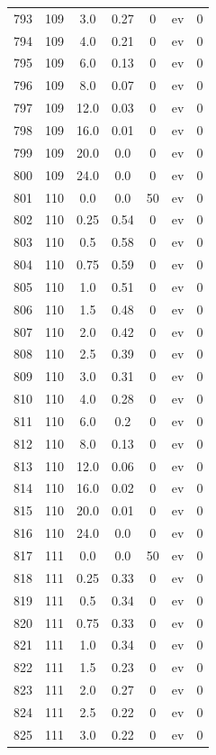\documentclass[12pt,a4paper]{article}
\begin{document}
\begin{tabular}{r|cccccc}
	793 & 109 & 3.0 & 0.27 & 0 & ev & 0 \\
	794 & 109 & 4.0 & 0.21 & 0 & ev & 0 \\
	795 & 109 & 6.0 & 0.13 & 0 & ev & 0 \\
	796 & 109 & 8.0 & 0.07 & 0 & ev & 0 \\
	797 & 109 & 12.0 & 0.03 & 0 & ev & 0 \\
	798 & 109 & 16.0 & 0.01 & 0 & ev & 0 \\
	799 & 109 & 20.0 & 0.0 & 0 & ev & 0 \\
	800 & 109 & 24.0 & 0.0 & 0 & ev & 0 \\
	801 & 110 & 0.0 & 0.0 & 50 & ev & 0 \\
	802 & 110 & 0.25 & 0.54 & 0 & ev & 0 \\
	803 & 110 & 0.5 & 0.58 & 0 & ev & 0 \\
	804 & 110 & 0.75 & 0.59 & 0 & ev & 0 \\
	805 & 110 & 1.0 & 0.51 & 0 & ev & 0 \\
	806 & 110 & 1.5 & 0.48 & 0 & ev & 0 \\
	807 & 110 & 2.0 & 0.42 & 0 & ev & 0 \\
	808 & 110 & 2.5 & 0.39 & 0 & ev & 0 \\
	809 & 110 & 3.0 & 0.31 & 0 & ev & 0 \\
	810 & 110 & 4.0 & 0.28 & 0 & ev & 0 \\
	811 & 110 & 6.0 & 0.2 & 0 & ev & 0 \\
	812 & 110 & 8.0 & 0.13 & 0 & ev & 0 \\
	813 & 110 & 12.0 & 0.06 & 0 & ev & 0 \\
	814 & 110 & 16.0 & 0.02 & 0 & ev & 0 \\
	815 & 110 & 20.0 & 0.01 & 0 & ev & 0 \\
	816 & 110 & 24.0 & 0.0 & 0 & ev & 0 \\
	817 & 111 & 0.0 & 0.0 & 50 & ev & 0 \\
	818 & 111 & 0.25 & 0.33 & 0 & ev & 0 \\
	819 & 111 & 0.5 & 0.34 & 0 & ev & 0 \\
	820 & 111 & 0.75 & 0.33 & 0 & ev & 0 \\
	821 & 111 & 1.0 & 0.34 & 0 & ev & 0 \\
	822 & 111 & 1.5 & 0.23 & 0 & ev & 0 \\
	823 & 111 & 2.0 & 0.27 & 0 & ev & 0 \\
	824 & 111 & 2.5 & 0.22 & 0 & ev & 0 \\
	825 & 111 & 3.0 & 0.22 & 0 & ev & 0 \\

\end{tabular}
\end{document}
